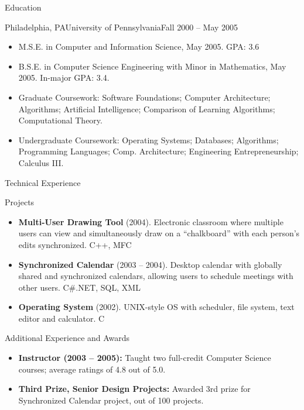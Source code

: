\documentclass[]{mcdowellcv}
\begin{document}
    \begin{cvsection}{Education}
        \begin{cvsubsection}{Philadelphia, PA}{University of Pennsylvania}{Fall 2000 -- May 2005}
            \begin{itemize}
                \item M.S.E. in Computer and Information Science, May 2005. GPA: 3.6
                \item B.S.E. in Computer Science Engineering with Minor in Mathematics, May 2005.  In-major GPA: 3.4.
                \item Graduate Coursework: Software Foundations; Computer Architecture; Algorithms; Artificial Intelligence; Comparison of Learning Algorithms; Computational Theory.
                \item Undergraduate Coursework: Operating Systems; Databases; Algorithms; Programming Languages; Comp. Architecture; Engineering Entrepreneurship; Calculus III.
            \end{itemize}
        \end{cvsubsection}
    \end{cvsection}
    
    \begin{cvsection}{Technical Experience}
        \begin{cvsubsection}{Projects}{}{}
            \begin{itemize}
                \item \textbf{Multi-User Drawing Tool} (2004). Electronic classroom where multiple users can view and simultaneously draw on a “chalkboard” with each person’s edits synchronized.  C++, MFC
                \item \textbf{Synchronized Calendar} (2003 – 2004). Desktop calendar with globally shared and synchronized calendars, allowing users to schedule meetings with other users.  C\#.NET, SQL, XML
                \item \textbf{Operating System} (2002).  UNIX-style OS with scheduler, file system, text editor and calculator. C
            \end{itemize}
        \end{cvsubsection}
    \end{cvsection}
    
    \begin{cvsection}{Additional Experience and Awards}
        \begin{cvsubsection}{}{}{}    
            \begin{itemize}
                \item \textbf{Instructor (2003 – 2005):} Taught two full-credit Computer Science courses; average ratings of 4.8 out of 5.0.
                \item \textbf{Third Prize, Senior Design Projects:} Awarded 3rd prize for Synchronized Calendar project, out of 100 projects.
            \end{itemize}
        \end{cvsubsection}
    \end{cvsection}
    
\end{document}
